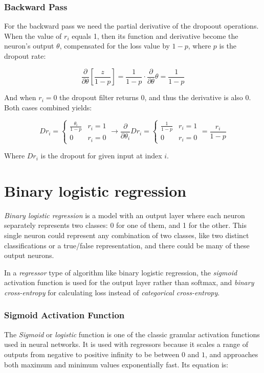\documentclass[a4paper]{report}
\begin{document}
\subsubsection*{Backward Pass}
For the backward pass we need the partial derivative of the dropoout operations. When the value of $r_i$ equals 1, then its function and derivative become the neuron's output $\theta$, compensated for the loss value by $1-p$, where $p$ is the dropout rate:

\begin{equation*}
    \frac{\partial}{\partial\theta}\left[\frac{z}{1-p}\right] = \frac{1}{1-p} \cdot \frac{\partial}{\partial\theta}\theta = \frac{1}{1-p}
\end{equation*}

And when $r_i = 0$ the dropout filter returns $0$, and thus the derivative is also $0$. Both cases combined yields:

\begin{equation*}
    Dr_i = \begin{cases}
        \frac{\theta_i}{1-p} & r_i = 1 \\
        0 & r_i = 0
    \end{cases} \rightarrow \frac{\partial}{\partial\theta_i}Dr_i = \begin{cases}
        \frac{1}{1-p} & r_i = 1 \\
        0 & r_i = 0
    \end{cases} = \frac{r_i}{1-p}
\end{equation*}

Where $Dr_i$ is the dropout for given input at index $i$.

\section{Binary logistic regression}
\emph{Binary logistic regression} is a model with an output layer where each neuron separately represents two classes: 0 for one of them, and 1 for the other. This single neuron could represent any combination of two classes, like two distinct classifications or a true/false representation, and there could be many of these output neurons.

In a \emph{regressor} type of algorithm like binary logistic regression, the \emph{sigmoid} activation function is used for the output layer rather than softmax, and \emph{binary cross-entropy} for calculating loss instead of \emph{categorical cross-entropy}.

\subsubsection*{Sigmoid Activation Function}
The \emph{Sigmoid} or \emph{logistic} function is one of the classic granular activation functions used in neural networks. It is used with regressors because it scales a range of outputs from negative to positive infinity to be between $0$ and $1$, and approaches both maximum and minimum values exponentially fast. Its equation is:
\end{document}
